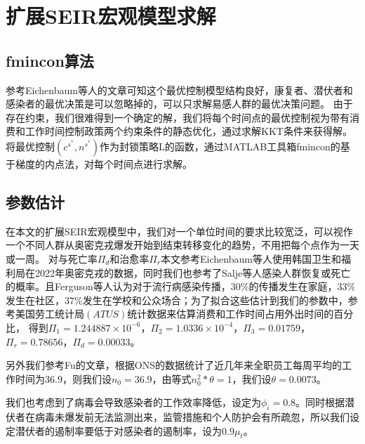 
\section{扩展SEIR宏观模型求解}

\subsection{fmincon算法}
参考Eichenbaum\cite{eichenbaum2021macroeconomics}等人的文章可知这个最优控制模型结构良好，康复者、潜伏者和感染者的最优决策是可以忽略掉的，可以只求解易感人群的最优决策问题。
由于存在约束，我们很难得到一个确定的解，我们将每个时间点的最优控制视为带有消费和工作时间控制政策两个约束条件的静态优化，通过求解KKT条件来获得解。将最优控制$(c^{s^*},n^{s^*})$作为封锁策略L的函数，通过MATLAB工具箱fmincon的基于梯度的内点法，对每个时间点进行求解。

\subsection{参数估计}
在本文的扩展SEIR宏观模型中，我们对一个单位时间的要求比较宽泛，可以视作一个不同人群从奥密克戎爆发开始到结束转移变化的趋势，不用把每个点作为一天或一周。
对与死亡率$\Pi_d$和治愈率$\Pi_r$本文参考Eichenbaum\cite{eichenbaum2021macroeconomics}等人使用韩国卫生和福利局在2022年奥密克戎的数据，同时我们也参考了Salje\cite{salje2020estimating}等人感染人群恢复或死亡的概率。且Ferguson\cite{ferguson2006strategies}等人认为对于流行病感染传播，$30\%$的传播发生在家庭，$33\%$发生在社区，$37\%$发生在学校和公众场合；为了拟合这些估计到我们的参数中，参考美国劳工统计局$(ATUS)$统计数据来估算消费和工作时间占用外出时间的百分比，
得到$\Pi_1=1.244887\times 10^{-6}$，$\Pi_2=1.0336 \times 10^{-4}$，$\Pi_3=0.01759$，$\Pi_r=0.78656$，$\Pi_d=0.00033$。

另外我们参考Fu\cite{fu2022optimal}的文章，根据ONS的数据统计了近几年来全职员工每周平均的工作时间为36.9，则我们设$n_0=36.9$，由等式$n_0^2*\theta=1$，我们设$\theta=0.0073$。

我们也考虑到了病毒会导致感染者的工作效率降低，设定为$\phi_i=0.8$。同时根据潜伏者在病毒未爆发前无法监测出来，监管措施和个人防护会有所疏忽，所以我们设定潜伏者的遏制率要低于对感染者的遏制率，设为$0.9\mu_t$。

